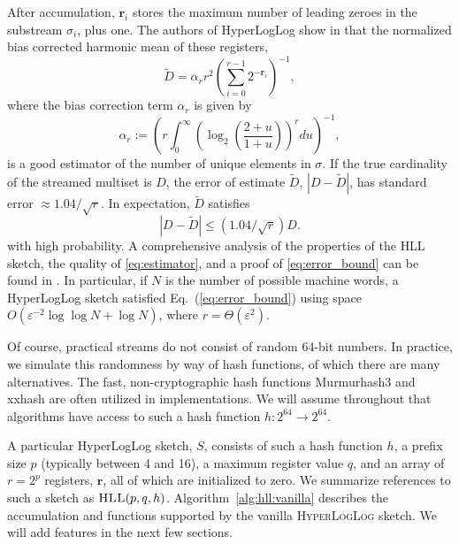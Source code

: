\documentclass{report}
\newcommand{\algoname}[1]{\textnormal{\textsc{#1}}}
\begin{document}
After accumulation, $\mathbf{r}_i$ stores the maximum number of leading zeroes in the substream $\sigma_i$, plus one. 
The authors of HyperLogLog show in \cite{flajolet2007hyperloglog} that the normalized bias corrected harmonic mean of these registers,
%
\begin{equation} \label{eq:estimator}
\widetilde{D} = \alpha_r r^2 \left ( \sum_{i=0}^{r-1} 2^{-\mathbf{r}_i} \right) ^{-1},
\end{equation}
%
where the bias correction term $\alpha_r$ is given by
%
%
\begin{equation} \label{eq:alpha}
\alpha_r :=  \left( r \int_{0}^\infty \left( \log_2 \left( \frac{2 + u}{1 + u} \right) \right)^r du \right) ^{-1},
\end{equation}
is a good estimator of the number of unique elements in $\sigma$.
If the true cardinality of the streamed multiset is $D$, the error of estimate $\widetilde{D}$, $|D - \widetilde{D}|$, has standard error $\approx 1.04 / \sqrt{r}$. 
In expectation, $\widetilde{D}$ satisfies
%
\begin{equation} \label{eq:error_bound}
|D - \widetilde{D}| \leq (1.04/\sqrt{r}) D.
\end{equation}
%
 with high probability.
A comprehensive analysis of the properties of the \algoname{HLL} sketch,  the quality of \eqref{eq:estimator}, and a proof of \eqref{eq:error_bound}  can be found in \cite{flajolet2007hyperloglog}.
In particular, if $N$ is the number of possible machine words, a HyperLogLog sketch satisfied Eq.~(\ref{eq:error_bound}) using space $O(\varepsilon^{-2} \log\log N + \log N)$, where $r = \Theta(\varepsilon^2)$.

Of course, practical streams do not consist of random 64-bit numbers. 
In practice, we simulate this randomness by way of hash functions, of which there are many alternatives. 
The fast, non-cryptographic hash functions Murmurhash3 \cite{?} and xxhash \cite{?} are often utilized in implementations. 
We will assume throughout that algorithms have access to such a hash function $h : 2^{64} \rightarrow 2^{64}$.

A particular HyperLogLog sketch, $S$, consists of such a hash function $h$, a prefix size $p$ (typically between 4 and 16), a maximum register value $q$, and an array of $r=2^p$ registers, $\mathbf{r}$, all of which are initialized to zero. 
We summarize references to such a sketch as $\algoname{HLL}(p,q,h)$.
Algorithm~\ref{alg:hll:vanilla} describes the accumulation and functions supported by the vanilla \algoname{HyperLogLog} sketch. 
We will add features in the next few sections. 
\end{document}
